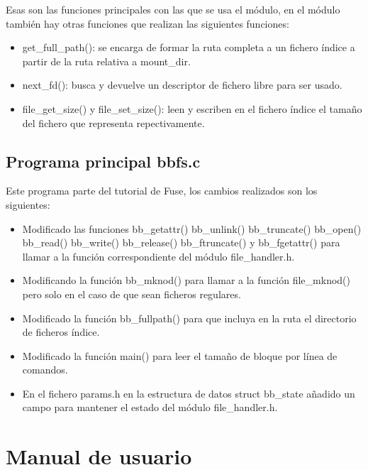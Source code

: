 \documentclass[a4paper,12pt]{article}
\begin{document}
Esas son las funciones principales con las que se usa el módulo, en el módulo también hay otras funciones que realizan las siguientes funciones:

\begin{itemize}
\item get\_full\_path(): se encarga de formar la ruta completa a un fichero índice a partir de la ruta relativa a mount\_dir.

\item next\_fd(): busca y devuelve un descriptor de fichero libre para ser usado.

\item file\_get\_size() y file\_set\_size(): leen y escriben en el fichero índice el tamaño del fichero que representa repectivamente.
\end{itemize}

\subsection{Programa principal bbfs.c}

Este programa parte del tutorial de Fuse, los cambios realizados son los siguientes:


\begin{itemize}
\item Modificado las funciones bb\_getattr() bb\_unlink() bb\_truncate() bb\_open() bb\_read() bb\_write() bb\_release() bb\_ftruncate() y bb\_fgetattr() para llamar a la función correspondiente del módulo file\_handler.h.

\item Modificando la función bb\_mknod() para llamar a la función file\_mknod() pero solo en el caso de que sean ficheros regulares.

\item Modificado la función bb\_fullpath() para que incluya en la ruta el directorio de ficheros índice.

\item Modificado la función main() para leer el tamaño de bloque por línea de comandos.

\item En el fichero params.h en la estructura de datos struct bb\_state añadido un campo para mantener el estado del módulo file\_handler.h.
\end{itemize}




\section{Manual de usuario}
\end{document}
